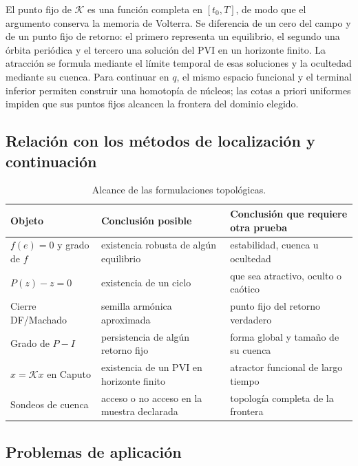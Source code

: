 El punto fijo de \(\mathcal K\) es una función completa en
\([t_0,T]\), de modo que el argumento conserva la memoria de Volterra.
Se diferencia de un cero del campo y de un punto fijo de retorno: el primero
representa un equilibrio, el segundo una órbita periódica y el tercero una
solución del PVI en un horizonte finito. La atracción se formula mediante el
límite temporal de esas soluciones y la ocultedad mediante su cuenca.
Para continuar en \(q\), el mismo espacio funcional y el terminal inferior
permiten construir una homotopía de núcleos; las cotas a priori uniformes
impiden que sus puntos fijos alcancen la frontera del dominio elegido.

\subsection{Relación con los métodos de localización y continuación}

\begin{table}[H]
\centering
\caption{Alcance de las formulaciones topológicas.}
\label{tab:topological-method-boundary}
\small
\begin{tabularx}{\textwidth}{@{}L{3.0cm}YY@{}}
\toprule
Objeto & Conclusión posible & Conclusión que requiere otra prueba \\
\midrule
$f(e)=0$ y grado de $f$ & existencia robusta de algún equilibrio & estabilidad, cuenca u ocultedad \\
$P(z)-z=0$ & existencia de un ciclo & que sea atractivo, oculto o caótico \\
Cierre DF/Machado & semilla armónica aproximada & punto fijo del retorno verdadero \\
Grado de $P-I$ & persistencia de algún retorno fijo & forma global y tamaño de su cuenca \\
$x=\mathcal Kx$ en Caputo & existencia de un PVI en horizonte finito & atractor funcional de largo tiempo \\
Sondeos de cuenca & acceso o no acceso en la muestra declarada & topología completa de la frontera \\
\bottomrule
\end{tabularx}
\end{table}

\ifHAFOPedagogy
\subsection{Problemas de aplicación}

